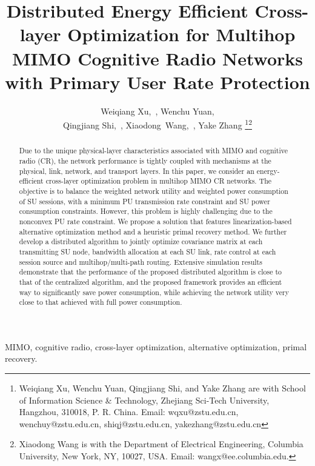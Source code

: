 \documentclass[12pt,onecolumn,tworows]{IEEEtran}
\begin{document}
\title{Distributed Energy Efficient Cross-layer Optimization for Multihop MIMO Cognitive Radio Networks with Primary User Rate Protection}
\author{Weiqiang Xu,~,
 Wenchu Yuan,\\
Qingjiang Shi,~,
Xiaodong~Wang,~,
Yake Zhang
\thanks{Weiqiang Xu, Wenchu Yuan, Qingjiang Shi, and Yake Zhang are with School of Information Science \& Technology, Zhejiang Sci-Tech University, Hangzhou, 310018, P. R. China. Email: wqxu@zstu.edu.cn, wenchuy@zstu.edu.cn, shiqj@zstu.edu.cn, yakezhang@zstu.edu.cn}\thanks{Xiaodong Wang is with the Department of Electrical Engineering, Columbia University, New York,
NY, 10027, USA. Email: wangx@ee.columbia.edu.}}
\maketitle

\baselineskip 25pt
\begin{abstract}
\baselineskip 18pt
Due to the unique physical-layer characteristics associated with MIMO and cognitive radio (CR), the network performance is tightly coupled with mechanisms at the physical, link, network, and transport layers. In this paper, we consider an energy-efficient cross-layer optimization problem in multihop MIMO CR networks. The objective is to balance the weighted network utility and weighted power consumption of SU sessions, with a minimum PU transmission rate constraint and SU power consumption constraints. However, this problem is highly challenging due to the nonconvex PU rate constraint. We propose a solution that features linearization-based alternative optimization method and a heuristic primal recovery method. We further develop a distributed algorithm to jointly optimize covariance matrix at each transmitting SU node, bandwidth allocation at each SU link, rate control at each session source and multihop/multi-path routing. Extensive simulation results demonstrate that the performance of the proposed distributed algorithm is close to that of the centralized algorithm, and the proposed framework provides an efficient way to significantly save power consumption, while achieving the network utility very close to that achieved with full power consumption.
\end{abstract}
\begin{IEEEkeywords}
MIMO, cognitive radio, cross-layer optimization, alternative optimization, primal recovery.
\end{IEEEkeywords}
\end{document}
